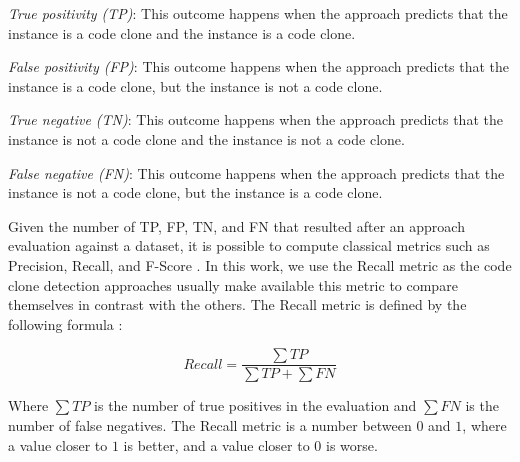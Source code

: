 \begin{itemize}
	\begin{item}
		\textit{True positivity (TP)}: This outcome happens when the approach predicts that the instance 
		is a code clone and the instance is a code clone.
	\end{item}
	\begin{item}
		\textit{False positivity (FP)}: This outcome happens when the approach predicts that the instance 
		is a code clone, but the instance is not a code clone.
	\end{item}
		\begin{item}
		\textit{True negative (TN)}: This outcome happens when the approach predicts that the instance 
		is not a code clone and the instance is not a code clone.
	\end{item}
	\begin{item}
		\textit{False negative (FN)}: This outcome happens when the approach predicts that the instance 
		is not a code clone, but the instance is a code clone.
	\end{item}
\end{itemize}

Given the number of TP, FP, TN, and FN that resulted after an approach evaluation against a dataset,
it is possible to compute classical metrics such as Precision, Recall, and F-Score \citep{recall}.
In this work, we use the Recall metric as the code clone detection approaches usually make available 
this metric to compare themselves in contrast with the others. The Recall metric is defined by the 
following formula \citep{recall}:

$$Recall = \frac{\sum TP}{\sum TP + \sum FN }$$

Where $\sum TP$ is the number of true positives in the evaluation and $\sum FN$ is the number of 
false negatives. The Recall metric is a number between $0$ and $1$, where a value closer to $1$ is 
better, and a value closer to $0$ is worse.









